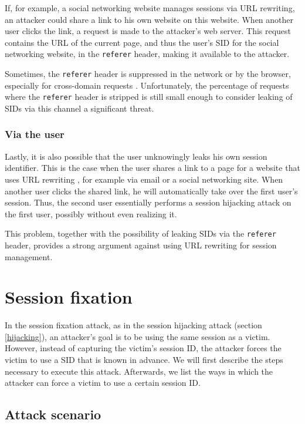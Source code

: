 If, for example, a social networking website manages sessions via URL rewriting, an attacker could share a link to his own website on this website. When another user clicks the link, a request is made to the attacker's web server. This request contains the URL of the current page, and thus the user's SID for the social networking website, in the \texttt{referer} header, making it available to the attacker.

Sometimes, the \texttt{referer} header is suppressed in the network or by the browser, especially for cross-domain requests \cite{Barth2008}. Unfortunately, the percentage of requests where the \texttt{referer} header is stripped is still small enough to consider leaking of SIDs via this channel a significant threat.

\subsubsection{Via the user}

Lastly, it is also possible that the user unknowingly leaks his own session identifier. This is the case when the user shares a link to a page for a website that uses URL rewriting \cite{Johnston2004}, for example via email or a social networking site. When another user clicks the shared link, he will automatically take over the first user's session. Thus, the second user essentially performs a session hijacking attack on the first user, possibly without even realizing it.

This problem, together with the possibility of leaking SIDs via the \texttt{referer} header, provides a strong argument against using URL rewriting for session management.

\section{Session fixation}\label{fixation}

In the session fixation attack, as in the session hijacking attack (section \ref{hijacking}), an attacker's goal is to be using the same session as a victim. However, instead of capturing the victim's session ID, the attacker forces the victim to use a SID that is known in advance. We will first describe the steps necessary to execute this attack. Afterwards, we list the ways in which the attacker can force a victim to use a certain session ID.

\subsection{Attack scenario}

